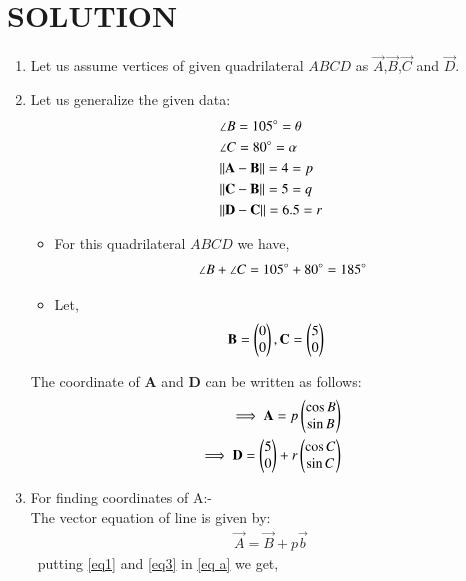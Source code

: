 \documentclass[journal,12pt,twocolumn]{IEEEtran}
\begin{document}
\section{SOLUTION}
\begin{enumerate}
\item Let us assume vertices of given quadrilateral $ABCD$ as $\vec{A}$,$\vec{B}$,$\vec{C}$ and $\vec{D}$.
\item Let us generalize the given data:
    \begin{align}
    &\angle B= 105\degree=\theta \label{eq1}
    \\
    &\angle C= 80\degree=\alpha \label{eq2}
    \\
    &\Vert\mathbf{A}-\mathbf{B}\rVert =4=p \label{eq3}
    \\
    &\Vert\mathbf{C}-\mathbf{B}\rVert =5=q \label{eq4}
    \\
     &\Vert\mathbf{D}-\mathbf{C}\rVert =6.5=r \label{eq5}
    \end{align}
\begin{itemize}
\item For this quadrilateral $ABCD$ we have,
\begin{align}
\angle B +\angle C = 105\degree + 80\degree =185\degree
\end{align}
\item Let, \begin{align}
    &\mathbf{B}=\begin{pmatrix}0\\0\end{pmatrix}, \mathbf{C}=\begin{pmatrix}5\\0\end{pmatrix} \label{eq6}
\end{align}
\end{itemize}
\begin{lemma}
\label{lemma}
The coordinate of \textbf{A} and \textbf{D} can be written as follows:
\begin{align}
\implies \mathbf{A}= p \begin{pmatrix}\cos B \\\sin B \end{pmatrix} \label{eq a}
\\
\implies \mathbf{D}=\begin{pmatrix}5\\0\end{pmatrix} + r \begin{pmatrix}\cos C\\\sin C \end{pmatrix} \label{eq b}
\end{align}
\end{lemma}
\item For finding coordinates of A:-
\\
The vector equation of line is given by:
\begin{align}
\vec{A}=\vec{B} + p \vec{b} 
\end{align}
\ putting \eqref{eq1} and \eqref{eq3} in \eqref{eq a} we get,
\begin{align}

\end{align}
\end{enumerate}
\end{document}
